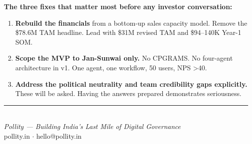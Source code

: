\documentclass[12pt, a4paper]{article}
\begin{document}
\textbf{The three fixes that matter most before any investor conversation:}

\begin{enumerate}[leftmargin=1.5em]
    \item \textbf{Rebuild the financials} from a bottom-up sales capacity model. Remove the \$78.6M TAM headline. Lead with \$31M revised TAM and \$94--140K Year-1 SOM.
    \item \textbf{Scope the MVP to Jan-Sunwai only.} No CPGRAMS. No four-agent architecture in v1. One agent, one workflow, 50 users, NPS \textgreater40.
    \item \textbf{Address the political neutrality and team credibility gaps explicitly.} These will be asked. Having the answers prepared demonstrates seriousness.
\end{enumerate}

\vfill
\begin{center}
    {\color{midgray}\rule{0.5\linewidth}{0.5pt}}\\[0.3cm]
    {\small\itshape Pollity --- Building India's Last Mile of Digital Governance}\\
    {\small pollity.in \quad $\cdot$ \quad hello@pollity.in}
\end{center}
\end{document}
